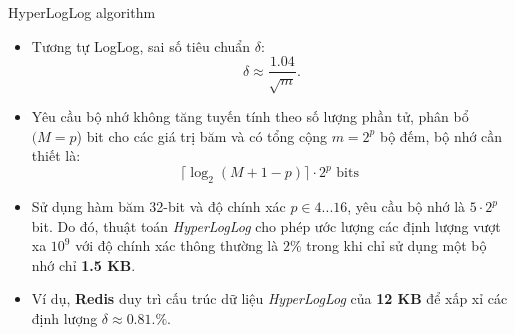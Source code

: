 \documentclass[10pt]{beamer}
\begin{document}
\begin{frame}{HyperLogLog algorithm}
\begin{itemize}
	\item Tương tự LogLog, sai số tiêu chuẩn $\delta$: \[\delta \approx \frac{1.04}{\sqrt{m}}.\]
	\item Yêu cầu bộ nhớ không tăng tuyến tính theo số lượng phần tử, phân bổ $(M=p$) bit cho các giá trị băm và có tổng cộng $m = 2^p$ bộ đếm, bộ nhớ cần thiết là:
  \[\lceil\log_2\left(M + 1 - p\right)\rceil\cdot2^p \text{ bits }\]
  \item Sử dụng hàm băm 32-bit và độ chính xác $p \in 4...16$, yêu cầu bộ nhớ là $5\cdot 2^p$ bit. Do đó, thuật toán \textit{HyperLogLog} cho phép ước lượng các định lượng vượt xa $10^9$ với độ chính xác thông thường là $2\%$ trong khi chỉ sử dụng một bộ nhớ chỉ \textbf{1.5 KB}.
  \item Ví dụ, \textbf{Redis} duy trì cấu trúc dữ liệu \textit{HyperLogLog} của \textbf{12 KB} để xấp xỉ các định lượng $\delta \approx 0.81.\%$.
\end{itemize}
\end{frame}
\end{document}
